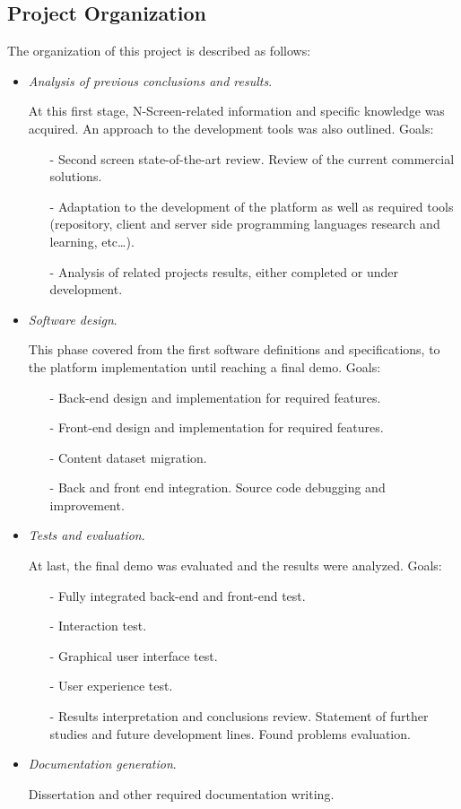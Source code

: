 \documentclass{acm_proc_article-sp}
\begin{document}
\subsection{Project Organization}
The organization of this project is described as follows:
\begin{itemize}
  \item \textit{Analysis of previous conclusions and results}. 
  
  At this first stage, N-Screen-related information and specific knowledge was acquired. An approach to the development tools was also outlined. Goals:
  \begin{itemize}
  	\item [-]Second screen state-of-the-art review. Review of the current commercial
solutions.
	\item [-]Adaptation to the development of the platform as well as required tools (repository, client and server side programming languages research and learning, etc\dots).
	\item [-]Analysis of related projects results, either completed or under development. 
  \end{itemize}
  
  \item \textit{Software design}.
  
  This phase covered from the first software definitions and  specifications, to the platform implementation until reaching a final demo. Goals:

  \begin{itemize}
  	\item [-]Back-end design and implementation for required features.
	\item [-]Front-end design and implementation for required features.
	\item [-]Content dataset migration. 
	\item [-]Back and front end integration. Source code
debugging and improvement. 
  \end{itemize}
	
  \item \textit{Tests and evaluation}. 
  
  At last, the final demo was evaluated and the results were analyzed. Goals:
  
  \begin{itemize}
  	\item [-]Fully integrated back-end and front-end test.
	\item [-]Interaction test.
	\item [-]Graphical user interface test.
	\item [-]User experience test.
	\item [-]Results interpretation and conclusions review. Statement of further studies and future development lines. Found problems evaluation.
  \end{itemize}
  
  \item \textit{Documentation generation}.
  
  Dissertation and other required documentation writing. 
\end{itemize}
\end{document}
